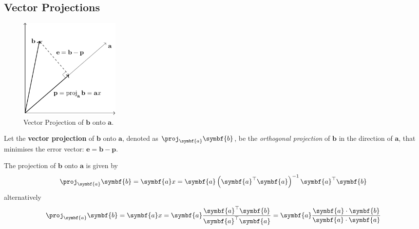 \documentclass{article}
\begin{document}
\subsection{Vector Projections}
\begin{figure}[H]
    \centering
    \includegraphics[height=5cm, keepaspectratio]{figures/vector_projection.pdf}
    \caption{Vector Projection of \(\symbf{b}\) onto \(\symbf{a}\).}
\end{figure}
\begin{definition}
    Let the \textbf{vector projection} of \(\symbf{b}\) onto
    \(\symbf{a}\), denoted as \(\proj_{\symbf{a}}\symbf{b}\), be
    the \textit{orthogonal projection} of \(\symbf{b}\)
    in the direction of \(\symbf{a}\), that minimises the error
    vector: \(\symbf{e}=\symbf{b}-\symbf{p}\).
\end{definition}
\begin{theorem}
    The projection of \(\symbf{b}\) onto \(\symbf{a}\) is given by
    \begin{equation*}
        \proj_{\symbf{a}}\symbf{b} = \symbf{a} x = \symbf{a} \left( \symbf{a}^\top \symbf{a} \right)^{-1}\symbf{a}^\top \symbf{b}
    \end{equation*}
    alternatively
    \begin{equation*}
        \proj_{\symbf{a}}\symbf{b} = \symbf{a} x = \symbf{a} \frac{\symbf{a}^\top \symbf{b}}{\symbf{a}^\top \symbf{a}} = \symbf{a} \frac{\symbf{a}\cdot\symbf{b}}{\symbf{a}\cdot\symbf{a}}
    \end{equation*}
\end{theorem}
\end{document}
